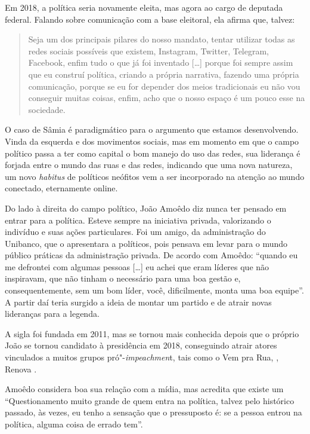 Em 2018, a política seria novamente eleita, mas agora ao cargo de
deputada federal. Falando sobre comunicação com a base eleitoral, ela
afirma que, talvez:

\begin{quote}
Seja um dos principais pilares do nosso mandato, tentar utilizar todas
as redes sociais possíveis que existem, Instagram, Twitter, Telegram,
Facebook, enfim tudo o que já foi inventado {[}\ldots{}{]} porque foi sempre
assim que eu construí política, criando a própria narrativa, fazendo uma
própria comunicação, porque se eu for depender dos meios tradicionais eu
não vou conseguir muitas coisas, enfim, acho que o nosso espaço é um
pouco esse na sociedade.
\end{quote}

O caso de Sâmia é paradigmático para o argumento que estamos
desenvolvendo. Vinda da esquerda e dos movimentos sociais, mas em
momento em que o campo político passa a ter como capital o bom manejo do
uso das redes, sua liderança é forjada entre o mundo das ruas e das
redes, indicando que uma nova natureza, um novo \emph{habitus} de
políticos neófitos vem a ser incorporado na atenção ao mundo conectado,
eternamente online.

Do lado à direita do campo político, João Amoêdo diz nunca ter pensado
em entrar para a política. Esteve sempre na iniciativa privada,
valorizando o indivíduo e suas ações particulares. Foi um amigo, da
administração do Unibanco, que o apresentara a políticos, pois pensava
em levar para o mundo público práticas da administração privada. De
acordo com Amoêdo: ``quando eu me defrontei com algumas pessoas
{[}\ldots{}{]} eu achei que eram líderes que não inspiravam, que não tinham o
 necessário para uma boa gestão e, consequentemente, sem um bom
líder, você, dificilmente, monta uma boa equipe''. A partir daí teria
surgido a ideia de montar um partido e de atrair novas lideranças para a
legenda.

A sigla foi fundada em 2011, mas se tornou mais conhecida depois que o
próprio João se tornou candidato à presidência em 2018, conseguindo
atrair atores vinculados a muitos grupos pró"-\emph{impeachmen}t, tais
como o Vem pra Rua, , Renova .

Amoêdo considera boa sua relação com a mídia, mas acredita que existe um
``Questionamento muito grande de quem entra na política, talvez pelo
histórico passado, às vezes, eu tenho a sensação que o pressuposto é: se
a pessoa entrou na política, alguma coisa de errado tem''.

